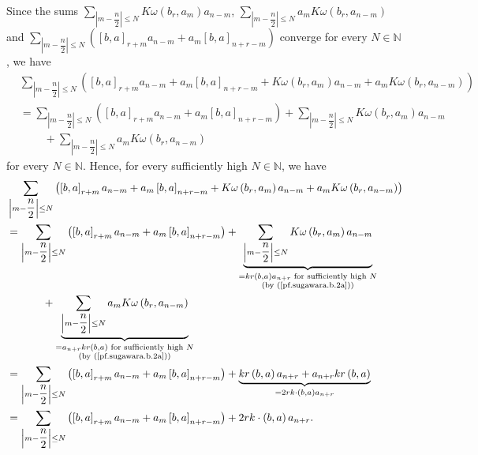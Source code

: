 \documentclass[etingof-lie.tex]{subfiles}
\begin{document}
Since the sums $\sum\limits_{\left\vert m-\dfrac{n}{2}\right\vert \leq
N}K\omega\left(  b_{r},a_{m}\right)  a_{n-m}$, $\sum\limits_{\left\vert
m-\dfrac{n}{2}\right\vert \leq N}a_{m}K\omega\left(  b_{r},a_{n-m}\right)  $
and \newline$\sum\limits_{\left\vert m-\dfrac{n}{2}\right\vert \leq N}\left(
\left[  b,a\right]  _{r+m}a_{n-m}+a_{m}\left[  b,a\right]  _{n+r-m}\right)  $
converge for every $N\in\mathbb{N}$, we have%
\begin{align*}
&  \sum\limits_{\left\vert m-\dfrac{n}{2}\right\vert \leq N}\left(  \left[
b,a\right]  _{r+m}a_{n-m}+a_{m}\left[  b,a\right]  _{n+r-m}+K\omega\left(
b_{r},a_{m}\right)  a_{n-m}+a_{m}K\omega\left(  b_{r},a_{n-m}\right)  \right)
\\
&  =\sum\limits_{\left\vert m-\dfrac{n}{2}\right\vert \leq N}\left(  \left[
b,a\right]  _{r+m}a_{n-m}+a_{m}\left[  b,a\right]  _{n+r-m}\right)
+\sum\limits_{\left\vert m-\dfrac{n}{2}\right\vert \leq N}K\omega\left(
b_{r},a_{m}\right)  a_{n-m}\\
&  \ \ \ \ \ \ \ \ \ \ +\sum\limits_{\left\vert m-\dfrac{n}{2}\right\vert \leq
N}a_{m}K\omega\left(  b_{r},a_{n-m}\right)
\end{align*}
for every $N\in\mathbb{N}$. Hence, for every sufficiently high $N\in
\mathbb{N}$, we have%
\begin{align}
&  \sum\limits_{\left\vert m-\dfrac{n}{2}\right\vert \leq N}\left(  \left[
b,a\right]  _{r+m}a_{n-m}+a_{m}\left[  b,a\right]  _{n+r-m}+K\omega\left(
b_{r},a_{m}\right)  a_{n-m}+a_{m}K\omega\left(  b_{r},a_{n-m}\right)  \right)
\nonumber\\
&  =\sum\limits_{\left\vert m-\dfrac{n}{2}\right\vert \leq N}\left(  \left[
b,a\right]  _{r+m}a_{n-m}+a_{m}\left[  b,a\right]  _{n+r-m}\right)
+\underbrace{\sum\limits_{\left\vert m-\dfrac{n}{2}\right\vert \leq N}%
K\omega\left(  b_{r},a_{m}\right)  a_{n-m}}_{\substack{=kr\left(  b,a\right)
a_{n+r}\text{ for sufficiently high }N\\\text{(by (\ref{pf.sugawara.b.2a}))}%
}}\nonumber\\
&  \ \ \ \ \ \ \ \ \ \ +\underbrace{\sum\limits_{\left\vert m-\dfrac{n}%
{2}\right\vert \leq N}a_{m}K\omega\left(  b_{r},a_{n-m}\right)  }%
_{\substack{=a_{n+r}kr\left(  b,a\right)  \text{ for sufficiently high
}N\\\text{(by (\ref{pf.sugawara.b.2a}))}}}\nonumber\\
&  =\sum\limits_{\left\vert m-\dfrac{n}{2}\right\vert \leq N}\left(  \left[
b,a\right]  _{r+m}a_{n-m}+a_{m}\left[  b,a\right]  _{n+r-m}\right)
+\underbrace{kr\left(  b,a\right)  a_{n+r}+a_{n+r}kr\left(  b,a\right)
}_{=2rk\cdot\left(  b,a\right)  a_{n+r}}\nonumber\\
&  =\sum\limits_{\left\vert m-\dfrac{n}{2}\right\vert \leq N}\left(  \left[
b,a\right]  _{r+m}a_{n-m}+a_{m}\left[  b,a\right]  _{n+r-m}\right)
+2rk\cdot\left(  b,a\right)  a_{n+r}. \label{pf.sugawara.b.3.sufficiently}%
\end{align}
\end{document}
